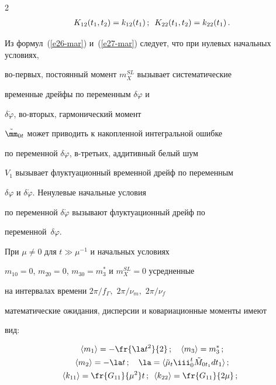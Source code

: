 \begin{multicols}{2}
\begin{gather*}
    K_{12}(t_1, t_2) = k_{12} (t_1)\,;\enskip K_{22} (t_1, t_2) = k_{22} (t_1)\,.




    \end{gather*}





Из формул~(\ref{e26-mar}) и~(\ref{e27-mar}) следует, что при нулевых начальных условиях,


во-пер\-вых, постоянный момент $m_X^{SL}$ вызывает сис\-те\-матические


временные дрейфы по переменным $\delta\varphi$ и


$\delta\dot\varphi$, во-вто\-рых, гармонический момент


$\tilde\mm_{0t}$ может приводить к накопленной интегральной ошибке


по переменной  $\delta\varphi$, в-третьих, аддитивный белый шум


$V_1$ вызывает флуктуационный временной дрейф по переменным


$\delta\varphi$ и $\delta\dot\varphi$. Ненулевые начальные условия


по переменной  $\delta\dot\varphi$ вызывают флуктуационный дрейф по


переменной~$\delta\varphi$.





При $\mu\ne 0$ для $t\gg\mu^{-1}$ и начальных условиях


$m_{10}=0$, $m_{20}  =0$, $m_{30} = m_3^*$ и $m_X^{SL} =0$ усредненные


на интервалах времени $2\pi / f_\Gamma,$ $2\pi /\nu_m,$ $2\pi/\nu_f$


математические ожидания, дисперсии и ковариационные моменты имеют


вид:


\begin{gather*}


\langle m_1 \rangle =-\fr{\la t^2}{ 2}\,;\quad \langle m_3 \rangle =m_3^*\,;\\


\langle m_2 \rangle =-\la t\,;\quad \la= \langle    \tilde\mu_t 


    \iii_0^t \tilde M_{0t_1} dt_1 \rangle\,; \\%


\langle k_{11} \rangle = \fr{G_{11}}{ \mu^2} t\,; \enskip


    \langle k_{22} \rangle = \fr{G_{11}}{2\mu}\,;\enskip



\end{gather*}
\end{multicols}
